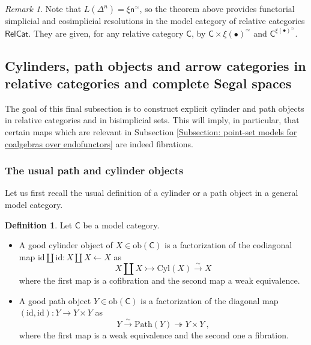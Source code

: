 \documentclass[a4paper,12pt]{amsart}
\theoremstyle{plain}
\theoremstyle{definition}
\newtheorem{definition}[theorem]{Definition}%
\theoremstyle{remark}
\newtheorem{remark}[theorem]{\sc Remark}%
\begin{document}
\begin{remark}

Note that $L(\Delta^n)=\xi\mathsf{n}^{\simeq}$, so the theorem above provides functorial simplicial and cosimplicial resolutions in the model category of relative categories $\mathsf{RelCat}$. They are given, for any relative category $\mathsf{C}$, by $\mathsf{C} \times \xi (\bullet)^{\simeq}$ and $\mathsf{C}^{\xi(\bullet)^{\simeq}}$.
\end{remark}

\subsection{Cylinders, path objects and arrow categories in relative categories and complete Segal spaces}
The goal of this final subsection is to construct explicit cylinder and path objects in relative categories and in bisimplicial sets. This will imply, in particular, that certain maps which are relevant in Subsection \ref{Subsection: point-set models for coalgebras over endofunctors} are indeed fibrations. 

\subsubsection{The usual path and cylinder objects} Let us first recall the usual definition of a cylinder or a path object in a general model category. 

\begin{definition}
Let $\mathsf{C}$ be a model category.
\begin{itemize}
\item[(1)] A good cylinder object of $X \in \mathrm{ob}(\mathsf{C})$ is a factorization of the codiagonal map $\mathrm{id} \amalg \mathrm{id}: X \amalg X \longleftarrow X$ as 
\[
X \amalg X\rightarrowtail \mathrm{Cyl}(X)\stackrel{\sim}{\rightarrow} X
\]
where the first map is a cofibration and the second map a weak equivalence.


\item[(2)] A good path object $Y\in \mathrm{ob}(\mathsf{C})$ is a factorization of the diagonal map $(\mathrm{id},\mathrm{id}): Y \longrightarrow Y \times Y$ as 
\[
Y\stackrel{\sim}{\rightarrow}\mathrm{Path}(Y)\twoheadrightarrow Y\times Y~,
\]
where the first map is a weak equivalence and the second one a fibration.
\end{itemize}
\end{definition}
\end{document}
